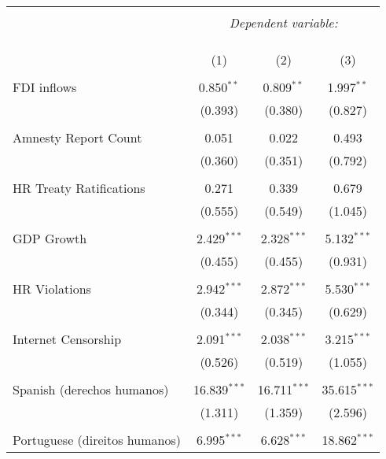 
\begin{table}[!htbp] \centering 
  \caption{} 
  \label{} 
\begin{tabular}{@{\extracolsep{5pt}}lccc} 
\\[-1.8ex]\hline 
\hline \\[-1.8ex] 
 & \multicolumn{3}{c}{\textit{Dependent variable:}} \\ 
\cline{2-4} 
\\[-1.8ex] & \multicolumn{3}{c}{ } \\ 
\\[-1.8ex] & (1) & (2) & (3)\\ 
\hline \\[-1.8ex] 
 FDI inflows & 0.850$^{**}$ & 0.809$^{**}$ & 1.997$^{**}$ \\ 
  & (0.393) & (0.380) & (0.827) \\ 
  & & & \\ 
 Amnesty Report Count & 0.051 & 0.022 & 0.493 \\ 
  & (0.360) & (0.351) & (0.792) \\ 
  & & & \\ 
 HR Treaty Ratifications & 0.271 & 0.339 & 0.679 \\ 
  & (0.555) & (0.549) & (1.045) \\ 
  & & & \\ 
 GDP Growth & 2.429$^{***}$ & 2.328$^{***}$ & 5.132$^{***}$ \\ 
  & (0.455) & (0.455) & (0.931) \\ 
  & & & \\ 
 HR Violations & 2.942$^{***}$ & 2.872$^{***}$ & 5.530$^{***}$ \\ 
  & (0.344) & (0.345) & (0.629) \\ 
  & & & \\ 
 Internet Censorship & 2.091$^{***}$ & 2.038$^{***}$ & 3.215$^{***}$ \\ 
  & (0.526) & (0.519) & (1.055) \\ 
  & & & \\ 
 Spanish (derechos humanos) & 16.839$^{***}$ & 16.711$^{***}$ & 35.615$^{***}$ \\ 
  & (1.311) & (1.359) & (2.596) \\ 
  & & & \\ 
 Portuguese (direitos humanos) & 6.995$^{***}$ & 6.628$^{***}$ & 18.862$^{***}$ \\ 

\end{tabular}
\end{table}
